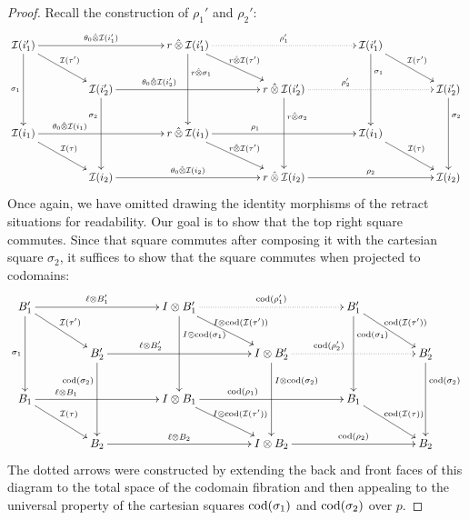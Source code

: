 \documentclass[reqno,10pt,a4paper,oneside]{amsart}
\begin{document}
\begin{proof}
Recall the construction of $\rho_1'$ and $\rho_2'$:
\[
\xymatrix@C+2em{
  \cal{I}(i_1')
  \ar[rr]^-{\thetal \hatotimes \cal{I}(i_1')}
  \ar[dd]_{\sigma_1}
  \ar[dr]^{\cal{I}(\tau')}
&&
  \intervalr \hatotimes \cal{I}(i_1')
  \ar@{.>}[rr]^-{\rho_1'}
  \ar[dd]^(0.3){\intervalr \hatotimes \sigma_1}
  \ar[dr]^{\intervalr \hatotimes \cal{I}(\tau')}
&&
  \cal{I}(i_1')
  \ar[dd]^(0.3){\sigma_1}
  \ar[dr]^{\cal{I}(\tau')}
\\&
  \cal{I}(i_2')
  \ar[rr]^-(0.3){\thetal \hatotimes \cal{I}(i_2')}
  \ar[dd]_(0.3){\sigma_2}
&&
  \intervalr \hatotimes \cal{I}(i_2')
  \ar@{.>}[rr]^-(0.3){\rho_2'}
  \ar[dd]^(0.3){\intervalr \hatotimes \sigma_2}
&&
  \cal{I}(i_2')
  \ar[dd]^(0.3){\sigma_2}
\\
  \cal{I}(i_1)
  \ar[rr]^-(0.25){\thetal \hatotimes \cal{I}(i_1)}
  \ar[dr]^{\cal{I}(\tau)}
&&
  \intervalr \hatotimes \cal{I}(i_1)
  \ar[rr]^-(0.3){\rho_1}
  \ar[dr]^{\intervalr \hatotimes \cal{I}(\tau')}
&&
  \cal{I}(i_1)
  \ar[dr]^{\cal{I}(\tau)}
\\&
  \cal{I}(i_2)
  \ar[rr]^-{\thetal \hatotimes \cal{I}(i_2)}
&&
  \intervalr \hatotimes \cal{I}(i_2)
  \ar[rr]^-{\rho_2}
&&
  \cal{I}(i_2)
}
\]
Once again, we have omitted drawing the identity morphisms of the retract situations for readability.
Our goal is to show that the top right square commutes.
Since that square commutes after composing it with the cartesian square $\sigma_2$, it suffices to show that the square commutes when projected to codomains:
\[
\xymatrix@C+2em{
  B_1'
  \ar[rr]^-{\intervall \otimes B_1'}
  \ar[dd]_{\sigma_1}
  \ar[dr]^{\cal{I}(\tau')}
&&
  \interval \otimes B_1'
  \ar@{.>}[rr]^-{\cod(\rho_1')}
  \ar[dd]^(0.3){\interval \otimes \cod(\sigma_1)}
  \ar[dr]^{\interval \otimes \cod(\cal{I}(\tau'))}
&&
  B_1'
  \ar[dd]^(0.3){\cod(\sigma_1)}
  \ar[dr]^{\cod(\cal{I}(\tau'))}
\\&
  B_2'
  \ar[rr]^-(0.3){\intervall \otimes B_2'}
  \ar[dd]_(0.3){\cod(\sigma_2)}
&&
  \interval \otimes B_2'
  \ar@{.>}[rr]^-(0.3){\cod(\rho_2')}
  \ar[dd]^(0.3){\interval \otimes \cod(\sigma_2)}
&&
  B_2'
  \ar[dd]^(0.3){\cod(\sigma_2)}
\\
  B_1
  \ar[rr]^-(0.25){\intervall \otimes B_1}
  \ar[dr]^{\cal{I}(\tau)}
&&
  \interval \otimes B_1
  \ar[rr]^-(0.3){\cod(\rho_1)}
  \ar[dr]^{\interval \otimes \cod(\cal{I}(\tau'))}
&&
  B_1
  \ar[dr]^{\cod(\cal{I}(\tau))}
\\&
  B_2
  \ar[rr]^-{\intervall \otimes B_2}
&&
  \interval \otimes B_2
  \ar[rr]^-{\cod(\rho_2)}
&&
  B_2
}
\]
The dotted arrows were constructed by extending the back and front faces of this diagram to the total space of the codomain fibration and then appealing to the universal property of the cartesian squares $\operatorname{cod}(\sigma_1)$ and $\operatorname{cod}(\sigma_2)$ over $p$.

\end{proof}
\end{document}
